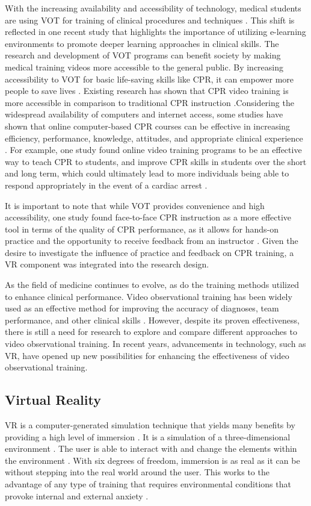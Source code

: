 \documentclass[manuscript]{./Models/acmart}
\begin{document}
With the increasing availability and accessibility of technology, medical students are using VOT for training of clinical procedures and techniques \cite{jang-2014}. This shift is reflected in one recent study that highlights the importance of utilizing e-learning environments to promote deeper learning approaches in clinical skills\cite{gormley-2009}. The research and development of VOT programs can benefit society by making medical training videos more accessible to the general public. By increasing accessibility to VOT for basic life-saving skills like CPR, it can empower more people to save lives \cite{abella-2008}. Existing research has shown that CPR video training is more accessible in comparison to traditional CPR instruction \cite{todd-1998}.Considering the widespread availability of computers and internet access, some studies have shown that online computer-based CPR courses can be effective in increasing efficiency, performance, knowledge, attitudes, and appropriate clinical experience \cite{braslow-1997}. For example, one study found online video training programs to be an effective way to teach CPR to students, and improve CPR skills in students over the short and long term, which could ultimately lead to more individuals being able to respond appropriately in the event of a cardiac arrest \cite{paglino-2019}.

It is important to note that while VOT provides convenience and high accessibility, one study found face-to-face CPR instruction as a more effective tool in terms of the quality of CPR performance, as it allows for hands-on practice and the opportunity to receive feedback from an instructor \cite{lewinson-2003}. Given the desire to investigate the influence of practice and feedback on CPR training, a VR component was integrated into the research design.

As the field of medicine continues to evolve, as do the training methods utilized to enhance clinical performance. Video observational training has been widely used as an effective method for improving the accuracy of diagnoses, team performance, and other clinical skills \cite{jang-2014}. However, despite its proven effectiveness, there is still a need for research to explore and compare different approaches to video observational training. In recent years, advancements in technology, such as VR, have opened up new possibilities for enhancing the effectiveness of video observational training.

\subsection{Virtual Reality}
VR is a computer-generated simulation technique that yields many benefits by providing a high level of immersion \cite{gaddis-1997}. It is a simulation of a three-dimensional environment \cite{gaddis-1997}. The user is able to interact with and change the elements within the environment \cite{gaddis-1997}. With six degrees of freedom, immersion is as real as it can be without stepping into the real world around the user. This works to the advantage of any type of training that requires environmental conditions that provoke internal and external anxiety \cite{riva-2019}.
\end{document}
